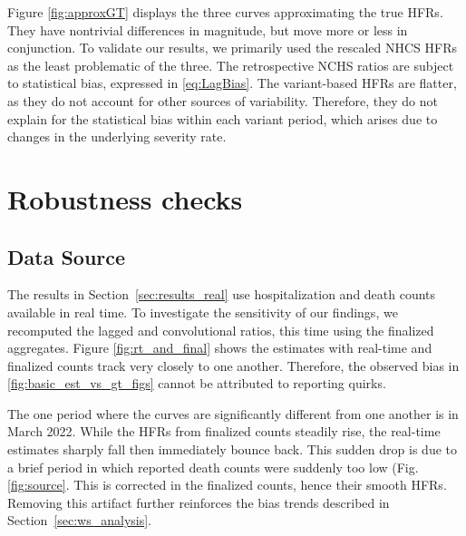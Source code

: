 \documentclass{article}
\begin{document}
Figure \ref{fig:approxGT} displays the three curves approximating the true HFRs. They have nontrivial differences in magnitude, but move more or less in conjunction. To validate our results, we primarily used the rescaled NHCS HFRs as the least problematic of the three. The retrospective NCHS ratios are subject to statistical bias, expressed in \eqref{eq:LagBias}. The variant-based HFRs are flatter, as they do not account for other sources of variability. Therefore, they do not explain for the statistical bias within each variant period, which arises due to changes in the underlying severity rate.  %

\section{Robustness checks}\label{apx:robustness}
\subsection{Data Source}
The results in Section~\ref{sec:results_real} use hospitalization and death counts available in real time. To investigate the sensitivity of our findings, we recomputed the lagged and convolutional ratios, this time using the finalized aggregates. Figure \ref{fig:rt_and_final} shows the estimates with real-time and finalized counts track very closely to one another. Therefore, the observed bias in \ref{fig:basic_est_vs_gt_figs} cannot be attributed to reporting quirks.

The one period where the curves are significantly different from one another is in March 2022. While the HFRs from finalized counts steadily rise, the real-time estimates sharply fall then immediately bounce back. This sudden drop is due to a brief period in which reported death counts were suddenly too low (Fig. \ref{fig:source}. This is corrected in the finalized counts, hence their smooth HFRs. Removing this artifact further reinforces the bias trends described in Section~\ref{sec:ws_analysis}.
\end{document}
